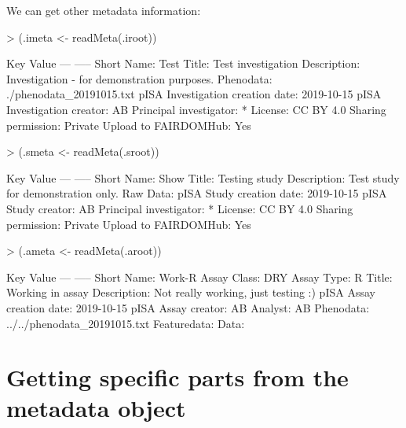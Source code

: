 \documentclass[a4paper,12pt]{article}\usepackage[]{graphicx}\usepackage[]{color}
\begin{document}
We can get other metadata information:

\begin{Schunk}
\begin{Sinput}
> (.imeta <- readMeta(.iroot))
\end{Sinput}
\begin{Soutput}
 Key                               Value
 ---                              -----
 Short Name:                       Test
 Title:                            Test investigation
 Description:                      Investigation - for demonstration purposes.
 Phenodata:                        ./phenodata_20191015.txt
 pISA Investigation creation date: 2019-10-15
 pISA Investigation creator:       AB
 Principal investigator:           *
 License:                          CC BY 4.0
 Sharing permission:               Private
 Upload to FAIRDOMHub:             Yes
\end{Soutput}
\begin{Sinput}
> (.smeta <- readMeta(.sroot))
\end{Sinput}
\begin{Soutput}
 Key                       Value
 ---                       -----
 Short Name:               Show
 Title:                    Testing study
 Description:              Test study for demonstration only.
 Raw Data:                 
 pISA Study creation date: 2019-10-15
 pISA Study creator:       AB
 Principal investigator:   *
 License:                  CC BY 4.0
 Sharing permission:       Private
 Upload to FAIRDOMHub:     Yes
\end{Soutput}
\begin{Sinput}
> (.ameta <- readMeta(.aroot))
\end{Sinput}
\begin{Soutput}
 Key                       Value
 ---                       -----
 Short Name:               Work-R
 Assay Class:              DRY
 Assay Type:               R
 Title:                    Working in assay
 Description:              Not really working, just testing :)
 pISA Assay creation date: 2019-10-15
 pISA Assay creator:       AB
 Analyst:                  AB
 Phenodata:                ../../phenodata_20191015.txt
 Featuredata:              
 Data:                     
\end{Soutput}
\end{Schunk}

\section{Getting specific parts from the metadata object}
\end{document}
